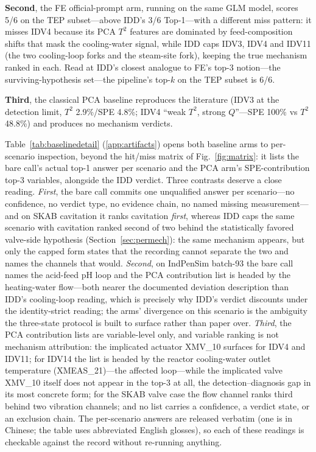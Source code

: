 \documentclass[preprint,12pt]{elsarticle}
\begin{document}
\textbf{Second}, the FE official-prompt arm, running on the same GLM model, scores 5/6 on the TEP subset---above IDD's 3/6 Top-1---with a different miss pattern: it misses IDV4 because its PCA $T^2$ features are dominated by feed-composition shifts that mask the cooling-water signal, while IDD caps IDV3, IDV4 and IDV11 (the two cooling-loop forks and the steam-site fork), keeping the true mechanism ranked in each. Read at IDD's closest analogue to FE's top-3 notion---the surviving-hypothesis set---the pipeline's top-$k$ on the TEP subset is 6/6.

\textbf{Third}, the classical PCA baseline reproduces the literature (IDV3 at the detection limit, $T^2$ 2.9\%/SPE 4.8\%; IDV4 ``weak $T^2$, strong $Q$''---SPE 100\% vs $T^2$ 48.8\%) and produces no mechanism verdicts.

Table~\ref{tab:baselinedetail} (\ref{app:artifacts}) opens both baseline arms to per-scenario inspection, beyond the hit/miss matrix of Fig.~\ref{fig:matrix}: it lists the bare call's actual top-1 answer per scenario and the PCA arm's SPE-contribution top-3 variables, alongside the IDD verdict. Three contrasts deserve a close reading. \emph{First}, the bare call commits one unqualified answer per scenario---no confidence, no verdict type, no evidence chain, no named missing measurement---and on SKAB cavitation it ranks cavitation \emph{first}, whereas IDD caps the same scenario with cavitation ranked second of two behind the statistically favored valve-side hypothesis (Section~\ref{sec:permech}): the same mechanism appears, but only the capped form states that the recording cannot separate the two and names the channels that would. \emph{Second}, on IndPenSim batch-93 the bare call names the acid-feed pH loop and the PCA contribution list is headed by the heating-water flow---both nearer the documented deviation description than IDD's cooling-loop reading, which is precisely why IDD's verdict discounts under the identity-strict reading; the arms' divergence on this scenario is the ambiguity the three-state protocol is built to surface rather than paper over. \emph{Third}, the PCA contribution lists are variable-level only, and variable ranking is not mechanism attribution: the implicated actuator XMV\_10 surfaces for IDV4 and IDV11; for IDV14 the list is headed by the reactor cooling-water outlet temperature (XMEAS\_21)---the affected loop---while the implicated valve XMV\_10 itself does not appear in the top-3 at all, the detection--diagnosis gap in its most concrete form; for the SKAB valve case the flow channel ranks third behind two vibration channels; and no list carries a confidence, a verdict state, or an exclusion chain. The per-scenario answers are released verbatim (one is in Chinese; the table uses abbreviated English glosses), so each of these readings is checkable against the record without re-running anything.
\end{document}
